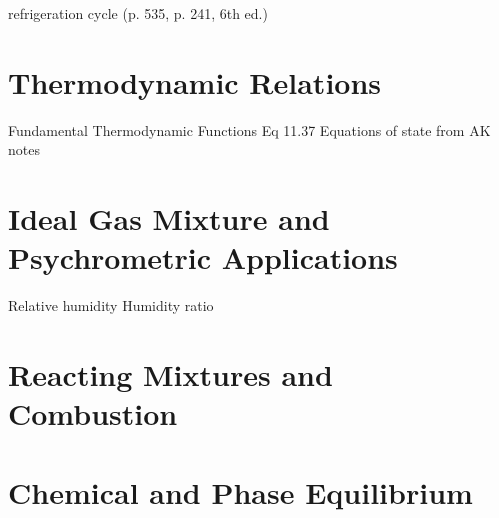 \documentclass[paper=letter, fontsize=11pt]{scrartcl}
\numberwithin{equation}{section}        %
\numberwithin{figure}{section}          %
\numberwithin{table}{section}               %
\begin{document}
refrigeration cycle (p. 535, p. 241, 6th ed.)


\newpage
\section{Thermodynamic Relations}

Fundamental Thermodynamic Functions Eq 11.37
Equations of state from AK notes


\newpage
\section{Ideal Gas Mixture and Psychrometric Applications}

Relative humidity
Humidity ratio


\newpage
\section{Reacting Mixtures and Combustion}

\section{Chemical and Phase Equilibrium}

\end{document}
